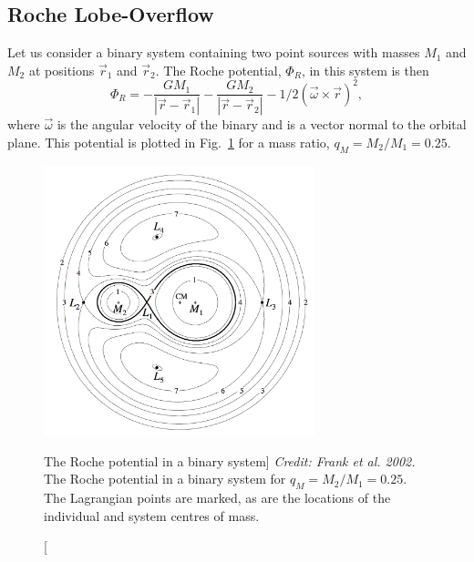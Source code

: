 \subsection{Roche Lobe-Overflow}
\label{sec:rlof}

Let us consider a binary system containing two point sources
with masses $M_1$ and $M_2$ at positions
$\vec{r}_1$ and $\vec{r}_2$. The Roche potential, $\Phi_R$, in this system 
is then
\begin{equation}
\Phi_R = - \frac{GM_1}{| \vec{r} - \vec{r}_1 |} - 
\frac{GM_2}{| \vec{r} - \vec{r}_2 |} - 1/2 (\vec{\omega} \times
 \vec{r})^2,
\label{eq:roche}
\end{equation} 
where $\vec{\omega}$ is the angular velocity of the binary and is a vector normal to
the orbital plane. This potential is plotted in Fig.~\ref{fig:roche} for a mass ratio, 
$q_M = M_2 / M_1 = 0.25$.

\begin{figure}
\centering
\includegraphics[width=0.7\textwidth]{figures/01-intro/roche_potential.png}
\caption
[The Roche potential in a binary system]
{
{\sl Credit: Frank et al. 2002.} 
The Roche potential in a binary system for $q_M = M_2 / M_1 = 0.25$.
The Lagrangian points are marked, as are the locations of the individual
and system centres of mass.
} 
\label{fig:roche}
\end{figure}


